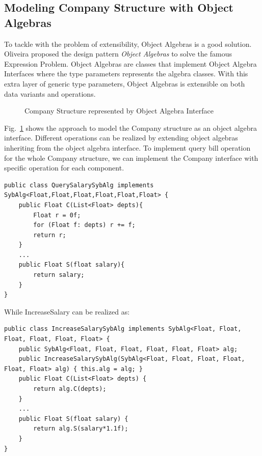 


\subsection{Modeling Company Structure with Object Algebras}

To tackle with the problem of extensibility, Object Algebras is a good solution.  Oliveira proposed the design pattern \emph{Object Algebras}\cite{bruno12oa} to solve the famous Expression Problem. Object Algebras are classes that implement Object Algebra Interfaces where the type parameters represents the algebra classes. With this extra layer of generic type parameters, Object Algebras is extensible on both data variants and operations.  

\begin{figure}[tb]
\vspace{-.1in}
\caption{Company Structure represented by Object Algebra Interface}
\label{syb_tree}
\end{figure}

Fig.~\ref{syb_tree} shows the approach to model the Company
structure as an object algebra interface. Different operations can be realized by extending object algebras inheriting from the object algebra interface. To implement query bill
operation for the whole Company structure, we can implement the
Company interface with specific operation for each component.

\begin{lstlisting}[numbers=none] 
public class QuerySalarySybAlg implements SybAlg<Float,Float,Float,Float,Float,Float> {
	public Float C(List<Float> depts){
		Float r = 0f;
		for (Float f: depts) r += f;
		return r;
	}
	...
	public Float S(float salary){
		return salary;
	}
}
\end{lstlisting}

While IncreaseSalary can be realized as: 

\begin{lstlisting}[numbers=none]
public class IncreaseSalarySybAlg implements SybAlg<Float, Float, Float, Float, Float, Float> {
	public SybAlg<Float, Float, Float, Float, Float, Float> alg;
	public IncreaseSalarySybAlg(SybAlg<Float, Float, Float, Float, Float, Float> alg) { this.alg = alg; }
	public Float C(List<Float> depts) {
		return alg.C(depts);
	}
	...
	public Float S(float salary) {
		return alg.S(salary*1.1f);
	}
}
\end{lstlisting}

